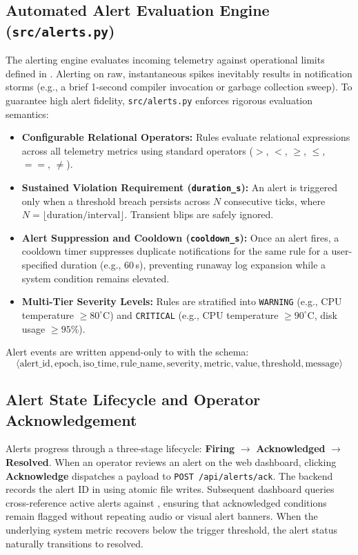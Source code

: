 \subsection{Automated Alert Evaluation Engine (\texttt{src/alerts.py})}
The alerting engine evaluates incoming telemetry against operational limits defined in . Alerting on raw, instantaneous spikes inevitably results in notification storms (e.g., a brief 1-second compiler invocation or garbage collection sweep). To guarantee high alert fidelity, \texttt{src/alerts.py} enforces rigorous evaluation semantics:
\begin{itemize}
    \item \textbf{Configurable Relational Operators:} Rules evaluate relational expressions across all telemetry metrics using standard operators ($>$, $<$, $\ge$, $\le$, $==$, $\ne$).
    \item \textbf{Sustained Violation Requirement (\texttt{duration\_s}):} An alert is triggered only when a threshold breach persists across $N$ consecutive ticks, where $N = \lfloor\text{duration} / \text{interval}\rfloor$. Transient blips are safely ignored.
    \item \textbf{Alert Suppression and Cooldown (\texttt{cooldown\_s}):} Once an alert fires, a cooldown timer suppresses duplicate notifications for the same rule for a user-specified duration (e.g., 60\,s), preventing runaway log expansion while a system condition remains elevated.
    \item \textbf{Multi-Tier Severity Levels:} Rules are stratified into \texttt{WARNING} (e.g., CPU temperature $\ge 80^\circ$C) and \texttt{CRITICAL} (e.g., CPU temperature $\ge 90^\circ$C, disk usage $\ge 95\%$).
\end{itemize}

Alert events are written append-only to  with the schema:
$$\langle\text{alert\_id}, \text{epoch}, \text{iso\_time}, \text{rule\_name}, \text{severity}, \text{metric}, \text{value}, \text{threshold}, \text{message}\rangle$$

\subsection{Alert State Lifecycle and Operator Acknowledgement}
Alerts progress through a three-stage lifecycle: \textbf{Firing} $\to$ \textbf{Acknowledged} $\to$ \textbf{Resolved}.
When an operator reviews an alert on the web dashboard, clicking \textbf{Acknowledge} dispatches a payload to \texttt{POST /api/alerts/ack}. The backend records the alert ID in  using atomic file writes. Subsequent dashboard queries cross-reference active alerts against , ensuring that acknowledged conditions remain flagged without repeating audio or visual alert banners. When the underlying system metric recovers below the trigger threshold, the alert status naturally transitions to resolved.

